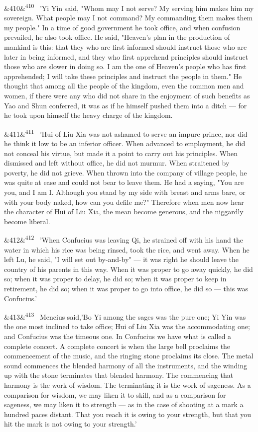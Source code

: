 \documentclass[12pt]{article}
\newcommand{\para}[1][]{\par\noindent\ifx&#1&\else\textsuperscript{\footnotesize #1}~\fi}
\begin{document}
\para[410] 'Yi Yin said, "Whom may I not serve? My serving him makes him my sovereign. What people may I not command? My commanding them makes them my people." In a time of good government he took office, and when confusion prevailed, he also took office. He said, "Heaven's plan in the production of mankind is this: that they who are first informed should instruct those who are later in being informed, and they who first apprehend principles should instruct those who are slower in doing so. I am the one of Heaven's people who has first apprehended; I will take these principles and instruct the people in them." He thought that among all the people of the kingdom, even the common men and women, if there were any who did not share in the enjoyment of such benefits as Yao and Shun conferred, it was as if he himself pushed them into a ditch --- for he took upon himself the heavy charge of the kingdom.

\para[411] 'Hui of Liu Xia was not ashamed to serve an impure prince, nor did he think it low to be an inferior officer. When advanced to employment, he did not conceal his virtue, but made it a point to carry out his principles. When dismissed and left without office, he did not murmur. When straitened by poverty, he did not grieve. When thrown into the company of village people, he was quite at ease and could not bear to leave them. He had a saying, "You are you, and I am I. Although you stand by my side with breast and arms bare, or with your body naked, how can you defile me?" Therefore when men now hear the character of Hui of Liu Xia, the mean become generous, and the niggardly become liberal.

\para[412] 'When Confucius was leaving Qi, he strained off with his hand the water in which his rice was being rinsed, took the rice, and went away. When he left Lu, he said, "I will set out by-and-by" --- it was right he should leave the country of his parents in this way. When it was proper to go away quickly, he did so; when it was proper to delay, he did so; when it was proper to keep in retirement, he did so; when it was proper to go into office, he did so --- this was Confucius.'

\para[413] Mencius said,'Bo Yi among the sages was the pure one; Yi Yin was the one most inclined to take office; Hui of Liu Xia was the accommodating one; and Confucius was the timeous one. In Confucius we have what is called a complete concert. A complete concert is when the large bell proclaims the commencement of the music, and the ringing stone proclaims its close. The metal sound commences the blended harmony of all the instruments, and the winding up with the stone terminates that blended harmony. The commencing that harmony is the work of wisdom. The terminating it is the work of sageness. As a comparison for wisdom, we may liken it to skill, and as a comparison for sageness, we may liken it to strength --- as in the case of shooting at a mark a hundred paces distant. That you reach it is owing to your strength, but that you hit the mark is not owing to your strength.'
\end{document}

